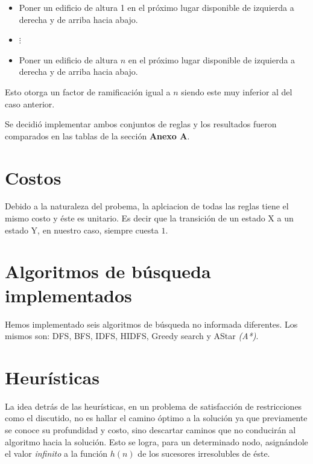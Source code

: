 \documentclass[%
    final,
    reprint,
    notitlepage,
    narroweqnarray,
    inline,
    twoside,
    invited
    ]{ieee}
\begin{document}
\begin{itemize}
\item Poner un edificio de altura 1 en el próximo lugar disponible de izquierda a derecha y de arriba hacia abajo.
\item $\vdots$
\item Poner un edificio de altura $n$ en el próximo lugar disponible de izquierda a derecha y de arriba hacia abajo.
\end{itemize}

\par Esto otorga un factor de ramificación igual a $n$ siendo este muy inferior al del caso anterior. \\
\par Se decidió implementar ambos conjuntos de reglas y los resultados fueron comparados en las tablas de la sección \textbf{Anexo A}.

\section{Costos}

\par Debido a la naturaleza del probema, la aplciacion de todas las reglas tiene el mismo costo y éste es unitario. Es decir que la transición de un estado X a un estado Y, en nuestro caso, siempre cuesta $1$.

\section{Algoritmos de búsqueda implementados}

\par Hemos implementado seis algoritmos de búsqueda no informada diferentes. Los mismos son: DFS, BFS, IDFS, HIDFS, Greedy search y AStar \textit{(A*)}.

\section{Heurísticas}

\par La idea detrás de las heurísticas, en un  problema de satisfacción de restricciones como el discutido, no es hallar el camino óptimo a la solución ya que previamente se conoce su profundidad y  costo,  sino descartar caminos que no conducirán al algoritmo hacia la solución. Esto se logra, para un determinado nodo, asignándole el valor \textit{infinito} a la función $h(n)$ de los sucesores irresolubles de éste.\\
\end{document}
